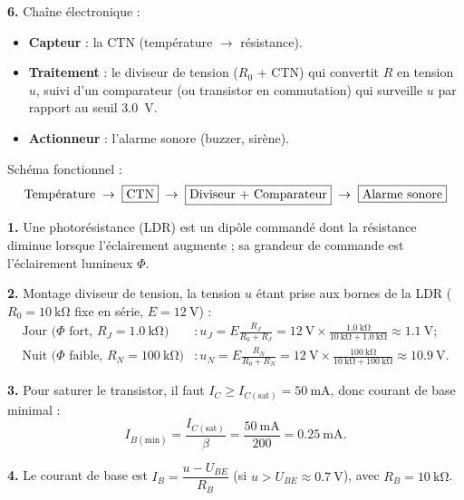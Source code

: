\documentclass[11pt]{article}
\newcommand{\cle}[1]{{\popxbold\color{popdark}#1}}
\begin{document}
\begin{corrige}
\textbf{6.} Chaîne électronique :
\begin{itemize}
\item \textbf{Capteur} : la CTN (température $\rightarrow$ résistance).
\item \textbf{Traitement} : le diviseur de tension ($R_0$ + CTN) qui convertit $R$ en tension $u$, suivi d'un comparateur (ou transistor en commutation) qui surveille $u$ par rapport au seuil \SI{3,0}{\volt}.
\item \textbf{Actionneur} : l'alarme sonore (buzzer, sirène).
\end{itemize}
Schéma fonctionnel : 
\[
\text{Température} \;\rightarrow\; \fbox{CTN} \;\rightarrow\; \fbox{Diviseur + Comparateur} \;\rightarrow\; \fbox{Alarme sonore}
\]
\end{corrige}

\begin{corrige}
\textbf{1.} Une \cle{photorésistance (LDR)} est un dipôle commandé dont la résistance diminue lorsque l'éclairement augmente ; sa grandeur de commande est l'éclairement lumineux $\Phi$.

\textbf{2.} Montage diviseur de tension, la tension $u$ étant prise aux bornes de la LDR ($R_0 = \SI{10}{\kilo\ohm}$ fixe en série, $E = \SI{12}{\volt}$) :
\begin{align*}
\text{Jour (} \Phi \text{ fort, } R_J = \SI{1,0}{\kilo\ohm} \text{)} &: u_J = E \frac{R_J}{R_0 + R_J} = \SI{12}{\volt} \times \frac{\SI{1,0}{\kilo\ohm}}{\SI{10}{\kilo\ohm} + \SI{1,0}{\kilo\ohm}} \approx \SI{1,1}{\volt} ;\\
\text{Nuit (} \Phi \text{ faible, } R_N = \SI{100}{\kilo\ohm} \text{)} &: u_N = E \frac{R_N}{R_0 + R_N} = \SI{12}{\volt} \times \frac{\SI{100}{\kilo\ohm}}{\SI{10}{\kilo\ohm} + \SI{100}{\kilo\ohm}} \approx \SI{10,9}{\volt}.
\end{align*}

\textbf{3.} Pour saturer le transistor, il faut $I_C \geq I_{C(\text{sat})} = \SI{50}{\milli\ampere}$, donc courant de base minimal :
\[ I_{B(\text{min})} = \frac{I_{C(\text{sat})}}{\beta} = \frac{\SI{50}{\milli\ampere}}{200} = \SI{0,25}{\milli\ampere}. \]

\textbf{4.} Le courant de base est $I_B = \dfrac{u - U_{BE}}{R_B}$ (si $u > U_{BE} \approx \SI{0,7}{\volt}$), avec $R_B = \SI{10}{\kilo\ohm}$.


\end{corrige}
\end{document}
